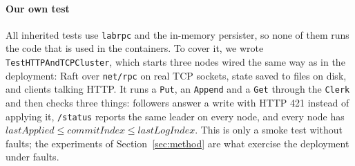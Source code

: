 \documentclass[conference]{IEEEtran}
\begin{document}
\paragraph{Our own test} All inherited tests use \texttt{labrpc} and the in-memory persister, so none of them runs the code that is used in the containers. To cover it, we wrote \texttt{TestHTTPAndTCPCluster}, which starts three nodes wired the same way as in the deployment: Raft over \texttt{net/rpc} on real TCP sockets, state saved to files on disk, and clients talking HTTP. It runs a \texttt{Put}, an \texttt{Append} and a \texttt{Get} through the \texttt{Clerk} and then checks three things: followers answer a write with HTTP 421 instead of applying it, \texttt{/status} reports the same leader on every node, and every node has $\textit{lastApplied} \le \textit{commitIndex} \le \textit{lastLogIndex}$. This is only a smoke test without faults; the experiments of Section~\ref{sec:method} are what exercise the deployment under faults.



\end{document}
